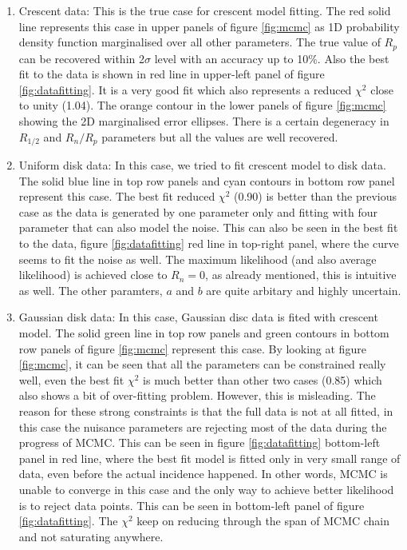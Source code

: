 \begin{enumerate}

\item Crescent data: This is the true case for crescent model fitting. The red solid line represents this case in upper panels of figure \ref{fig:mcmc} as 1D probability density function marginalised over all other parameters. The true value of $R_p$ can be recovered within 2$\sigma$ level with an accuracy up to 10\%. Also the best fit to the data is shown in red line in upper-left panel of figure \ref{fig:datafitting}. It is a very good fit which also represents a reduced $\chi^2$ close to unity (1.04). The orange contour in the lower panels of figure \ref{fig:mcmc} showing the 2D marginalised error ellipses. There is a certain degeneracy in $R_{1/2}$ and $R_n/R_p$ parameters but all the values are well recovered. 

\item Uniform disk data: In this case, we tried to fit crescent model to disk data. The solid blue line in top row panels and cyan contours in bottom row panel represent this case. The best fit reduced $\chi^2$ (0.90) is better than the previous case as the data is generated by one parameter only and fitting with four parameter that can also model the noise. This can also be seen in the best fit to the data, figure \ref{fig:datafitting} red line in top-right panel, where the curve seems to fit the noise as well. The maximum likelihood (and also average likelihood) is achieved close to $R_n = 0$, as already mentioned, this is intuitive as well. The other paramters, $a$ and $b$ are quite arbitary and highly uncertain. 

\item Gaussian disk data: In this case, Gaussian disc data is fited with crescent model. The solid green line in top row panels and green contours in bottom row panels of figure \ref{fig:mcmc} represent this case. By looking at figure \ref{fig:mcmc}, it can be seen that all the parameters can be constrained really well, even the best fit $\chi^2$ is much better than other two cases (0.85) which also shows a bit of over-fitting problem. However, this is misleading. The reason for these strong constraints is that the full data is not at all fitted, in this case the nuisance parameters are rejecting most of the data during the progress of MCMC. This can be seen in figure \ref{fig:datafitting} bottom-left panel in red line, where the best fit model is fitted only in very small range of data, even before the actual incidence happened. In other words, MCMC is unable to converge in this case and the only way to achieve better likelihood is to reject data points. This can be seen in bottom-left panel of figure \ref{fig:datafitting}. The $\chi^2$ keep on reducing through the span of MCMC chain and not saturating anywhere. 

\end{enumerate}

